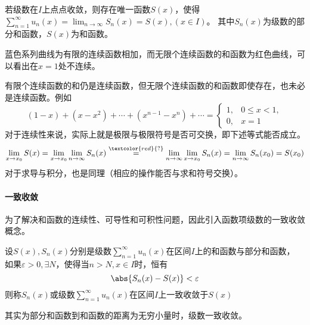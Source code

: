 若级数在$I$上点点收敛，则存在唯一函数$S(x)$，使得$\displaystyle\sum_{n=1}^\infty u_n(x) = \lim_{n\to\infty} S_n(x) = S(x), (x\in I)$。
其中$S_n(x)$为级数的部分和函数，$S(x)$为和函数。

\begin{marginfigure}
    \caption{蓝色系列曲线为有限的连续函数相加，而无限个连续函数的和函数为红色曲线，可以看出在$x=1$处不连续。}
\end{marginfigure}
有限个连续函数的和仍是连续函数，但无限个连续函数的和函数即使存在，也未必是连续函数。例如
\[
    (1-x) + (x-x^2) + \cdots + (x^{n-1}-x^n) + \cdots =
    \begin{cases}
        1, & 0\leq x < 1, \\
        0, & x=1
    \end{cases}
\]
对于连续性来说，实际上就是极限与极限符号是否可交换，即下述等式能否成立。
\[
    \lim_{x\to x_0}S(x)
    =
    \lim_{x\to x_0} \lim_{n\to\infty} S_n(x)
    \stackrel{\textcolor{red}{?}}{=}
    \lim_{n\to\infty} \lim_{x\to x_0} S_n(x)
    =
    \lim_{n\to\infty} S_n(x_0)
    =
    S(x_0)
\]
对于求导与积分，也是同理（相应的操作能否与求和符号交换）。

\paragraph{一致收敛}
为了解决和函数的连续性、可导性和可积性问题，因此引入函数项级数的一致收敛概念。
\begin{definition}
    设$S(x),S_n(x)$分别是级数$\displaystyle\sum_{n=1}^\infty u_n(x)$在区间$I$上的和函数与部分和函数，
    如果$\varepsilon > 0,\exists N$，使得当$n>N,x\in I$时，恒有
    \[ \abs{S_n(x) - S(x)} < \varepsilon \]
    则称$S_n(x)$或级数$\displaystyle\sum_{n=1}^\infty u_n(x)$在区间$I$上一致收敛于$S(x)$
\end{definition}
其实为部分和函数到和函数的距离为无穷小量时，级数一致收敛。

